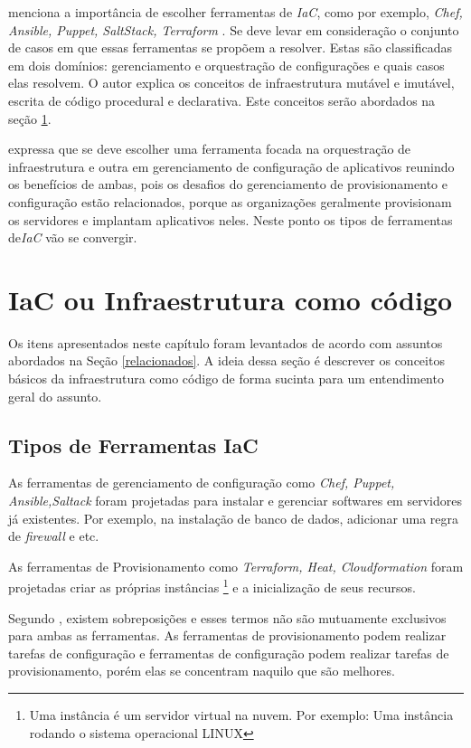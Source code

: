 \hfill

  menciona a importância de escolher ferramentas de \textit{IaC}, como por exemplo,\textit{ Chef, Ansible, Puppet, SaltStack, Terraform }. Se deve levar em consideração o conjunto de casos em que essas ferramentas se propõem a resolver. Estas são classificadas em dois domínios: gerenciamento e orquestração de configurações e quais casos elas resolvem. O autor explica os conceitos de infraestrutura mutável e imutável, escrita de código procedural e declarativa. Este conceitos serão abordados na seção \ref{IaC}. 

 expressa que se deve escolher uma ferramenta focada na orquestração de infraestrutura e outra em gerenciamento de configuração de aplicativos reunindo os benefícios de ambas, pois os desafios do gerenciamento de provisionamento e configuração estão relacionados, porque as organizações geralmente provisionam os servidores e implantam aplicativos neles. Neste ponto os tipos de ferramentas de\textit{IaC} vão se convergir.


\section{\esp IaC ou Infraestrutura como código} \label{IaC}

Os itens apresentados neste capítulo foram levantados de acordo com assuntos abordados na Seção \ref{relacionados}. A ideia dessa seção é descrever os conceitos básicos da infraestrutura como código de forma sucinta para um entendimento geral do assunto.


\subsection{Tipos de Ferramentas IaC}
As ferramentas de gerenciamento de configuração como \textit{Chef, Puppet, Ansible,Saltack} foram projetadas para instalar e gerenciar softwares em servidores já existentes. Por exemplo, na instalação de banco de dados, adicionar uma regra de \textit{firewall} e etc.

As ferramentas de Provisionamento como \textit{Terraform, Heat, Cloudformation} foram projetadas criar as próprias instâncias \footnote{Uma instância é um servidor virtual na nuvem. Por exemplo: Uma instância rodando o sistema operacional LINUX} e a inicialização de seus recursos. 

Segundo , existem sobreposições e esses termos não são mutuamente exclusivos para ambas as ferramentas. As ferramentas de provisionamento podem realizar tarefas de configuração e ferramentas de configuração podem realizar tarefas de provisionamento, porém elas se concentram naquilo que são melhores. 


